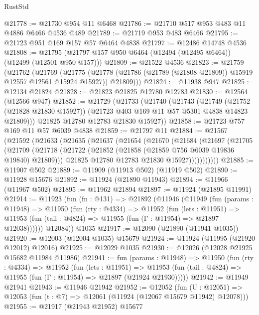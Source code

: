 \begin{lexlean}{RustStd}
\begin{coremodule}
@21778 := @21730 @954 @11 @6468
@21786 := @21710 @517 @953 @483 @11 @4886 @6466 @4536 @489
@21789 := @21719 @953 @483 @6466
@21795 := @21723 @951 @169 @157 @57 @6464 @4838
@21797 := @12486 @14748 @4536
@21808 := @21795 (@21797 @157 @950 @6464 (@12494 (@12495 @6464)) (@12499 (@12501 @950 @157)))
@21809 := @21522 @4536
@21823 := @21759
    (@21762
      (@21769
        (@21775
          (@21778 (@21786 (@21789 (@21808 @21809)) @15919 @12557 @12561 @15924 @15927))
          @21809)))
@21824 := @11938 @947
@21825 := @12134 @21824
@21828 := @21823 @21825 @12780 @12783
@21830 := @12564 (@12566 @947)
@21852 := @21729
    (@21733
      (@21740
        (@21743
          (@21749
            (@21752 (@21828 @21830 @15927))
            (@21723 @403 @169 @11 @57 @5301 @4838 @14823 @21809)))
        @21825
        @12780
        @12783
        @21830
        @15927))
@21858 := @21723 @757 @169 @11 @57 @6039 @4838
@21859 := @21797 @11
@21884 := @21567
    (@21592
      (@21633
        (@21635
          (@21637
            (@21654
              (@21670
                (@21684
                  (@21697
                    (@21705
                      (@21709
                        (@21718
                          (@21722 (@21852 (@21858 (@21859 @756 @6039 @19836 @19840) @21809)))
                          @21825
                          @12780
                          @12783
                          @21830
                          @15927)))))))))))
@21885 := @11907 @502
@21889 := @11909 (@11913 @502) (@11919 @502)
@21890 := @11928 @15676
@21892 := @11924 (@21890 @11943)
@21894 := @11966 (@11967 @502)
@21895 := @11962 @21894
@21897 := @11924 (@21895 @11991)
@21914 := @11923
    (fun (fn : @131) =>
    @21892
      (@11946
        (@11949
          (fun (params : @11948) =>
          @11950
            (fun (rty : @4334) =>
            @11952
              (fun (lets : @11951) =>
              @11953 (fun (tail : @4824) => @11955 (fun (Γ : @11954) => @21897 @12038))))))
        @12084))
    @1035
@21917 := @12090 (@21890 (@11941 @1035))
@21920 := @12003 (@12004 @1035) @15679
@21924 := @11924 (@11995 (@21920 @12012) @12016)
@21925 := @12029 @1035
@21930 := @12026 (@12028 @21925 @15682 @11984 @11986)
@21941 := fun (params : @11948) =>
  @11950
    (fun (rty : @4334) =>
    @11952
      (fun (lets : @11951) =>
      @11953 (fun (tail : @4824) => @11955 (fun (Γ : @11954) => @21897 (@21924 @21930)))))
@21942 := @11949 @21941
@21943 := @11946 @21942
@21952 := @12052
    (fun (U : @12051) => @12053 (fun (t : @7) => @12061 (@11924 (@12067 @15679 @11942) @12078)))
@21955 := @21917 (@21943 @21952) @15677

\end{coremodule}
\end{lexlean}
